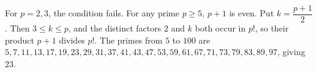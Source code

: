 For $p=2,3$, the condition fails. For any prime $p\ge 5$, $p+1$ is even. Put $k=\dfrac{p+1}{2}$. Then $3\le k\le p$, and the distinct factors $2$ and $k$ both occur in $p!$, so their product $p+1$ divides $p!$. The primes from $5$ to $100$ are $5,7,11,13,17,19,23,29,31,37,41,43,47,53,59,61,67,71,73,79,83,89,97$, giving $\boxed{23}$.
